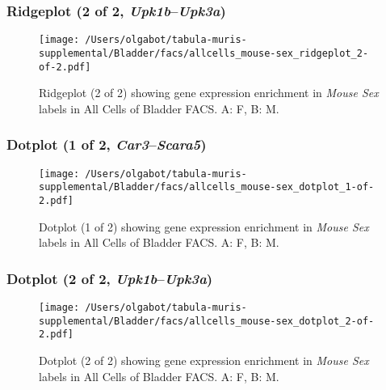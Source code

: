 \clearpage

\subsubsection{Ridgeplot (2 of 2, \emph{Upk1b}--\emph{Upk3a})}
\begin{figure}[h]
\centering
\texttt{[image: /Users/olgabot/tabula-muris-supplemental/Bladder/facs/allcells\_mouse-sex\_ridgeplot\_2-of-2.pdf]}

\caption{ Ridgeplot (2 of 2)  showing gene expression enrichment in \emph{Mouse Sex} labels in All Cells of Bladder FACS. A: F, B: M.}
\end{figure}


\clearpage

\subsubsection{Dotplot (1 of 2, \emph{Car3}--\emph{Scara5})}
\begin{figure}[h]
\centering
\texttt{[image: /Users/olgabot/tabula-muris-supplemental/Bladder/facs/allcells\_mouse-sex\_dotplot\_1-of-2.pdf]}

\caption{ Dotplot (1 of 2)  showing gene expression enrichment in \emph{Mouse Sex} labels in All Cells of Bladder FACS. A: F, B: M.}
\end{figure}


\clearpage

\subsubsection{Dotplot (2 of 2, \emph{Upk1b}--\emph{Upk3a})}
\begin{figure}[h]
\centering
\texttt{[image: /Users/olgabot/tabula-muris-supplemental/Bladder/facs/allcells\_mouse-sex\_dotplot\_2-of-2.pdf]}

\caption{ Dotplot (2 of 2)  showing gene expression enrichment in \emph{Mouse Sex} labels in All Cells of Bladder FACS. A: F, B: M.}
\end{figure}

